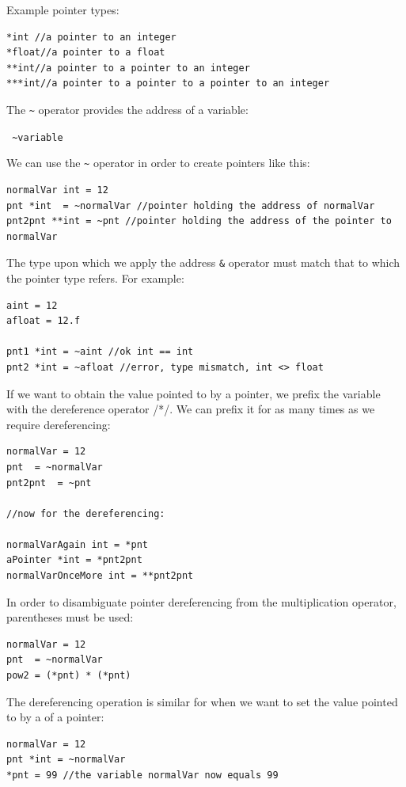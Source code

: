 \documentclass[conc-doc]{subfiles}
\begin{document}
Example pointer types:
\begin{lstlisting}
*int //a pointer to an integer
*float//a pointer to a float
**int//a pointer to a pointer to an integer
***int//a pointer to a pointer to a pointer to an integer
\end{lstlisting}

The \lstinline{~} operator provides the address of a variable:
\begin{center}
	\lstinline{ ~variable }
\end{center}

We can use the \lstinline{~} operator in order to create pointers like this:
\begin{lstlisting}
normalVar int = 12
pnt *int  = ~normalVar //pointer holding the address of normalVar 
pnt2pnt **int = ~pnt //pointer holding the address of the pointer to normalVar 
\end{lstlisting}

The type upon which we apply the address \lstinline{&} operator must match that to which the pointer type refers. For example:
\begin{lstlisting}
aint = 12
afloat = 12.f

pnt1 *int = ~aint //ok int == int
pnt2 *int = ~afloat //error, type mismatch, int <> float
\end{lstlisting}

If we want to obtain the value pointed to by a pointer, we prefix the variable with the dereference operator /*/. We can prefix it for as many times as we require dereferencing:
\begin{lstlisting}
normalVar = 12
pnt  = ~normalVar 
pnt2pnt  = ~pnt 

//now for the dereferencing:

normalVarAgain int = *pnt 
aPointer *int = *pnt2pnt
normalVarOnceMore int = **pnt2pnt
\end{lstlisting}

In order to disambiguate pointer dereferencing from the multiplication operator, parentheses must be used:
\begin{lstlisting}
normalVar = 12
pnt  = ~normalVar 
pow2 = (*pnt) * (*pnt)
\end{lstlisting}

The dereferencing operation is similar for when we want to set the value pointed to by a of a pointer:
\begin{lstlisting}
normalVar = 12
pnt *int = ~normalVar 
*pnt = 99 //the variable normalVar now equals 99
\end{lstlisting}
\end{document}
